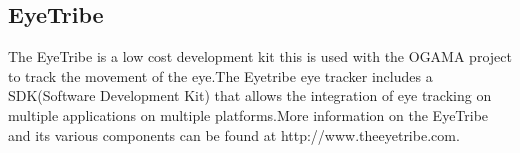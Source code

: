 \iffalse
\subsection{OGAMA}
OGAMA(OpenGazeAndMouseAnalyzer) is a free software that is used to view,capture and analyse interactive stimuli.The OGAMA.Currently OGAMA only allows for the tracking and analysis on slideshow based stimuli.OGAMA essentially uses the information gathered by the eye tracking camera to create analytics and show the user where on the slideshow the users viewed the most.OGAMA is also capable of tracking mouse movements.More information regarding OGAMA can be found at http://www.ogama.net.
\fi
\subsection{EyeTribe}
The EyeTribe is a low cost development kit this is used with the OGAMA project to track the movement of the eye.The Eyetribe eye tracker includes a SDK(Software Development Kit) that allows the integration of eye tracking on multiple applications on multiple platforms.More information on the EyeTribe and its various components can be found at http://www.theeyetribe.com.
